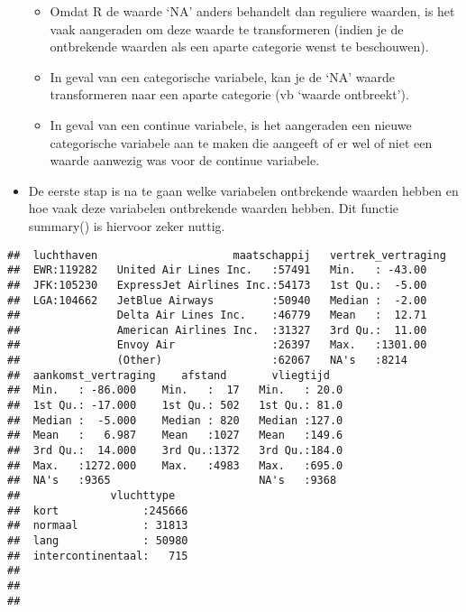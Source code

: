 \documentclass[]{memoir}
\providecommand{\tightlist}{%
  \setlength{\itemsep}{0pt}\setlength{\parskip}{0pt}}
\begin{document}
\begin{itemize}
  \begin{itemize}
  \tightlist
  \item
    Omdat R de waarde `NA' anders behandelt dan reguliere waarden, is het vaak aangeraden om deze waarde te transformeren (indien je de ontbrekende waarden als een aparte categorie wenst te beschouwen).
  \item
    In geval van een categorische variabele, kan je de `NA' waarde transformeren naar een aparte categorie (vb `waarde ontbreekt').
  \item
    In geval van een continue variabele, is het aangeraden een nieuwe categorische variabele aan te maken die aangeeft of er wel of niet een waarde aanwezig was voor de continue variabele.
  \end{itemize}
\item
  De eerste stap is na te gaan welke variabelen ontbrekende waarden hebben en hoe vaak deze variabelen ontbrekende waarden hebben. Dit functie summary() is hiervoor zeker nuttig.
\end{itemize}

\begin{verbatim}
##  luchthaven                     maatschappij   vertrek_vertraging
##  EWR:119282   United Air Lines Inc.   :57491   Min.   : -43.00   
##  JFK:105230   ExpressJet Airlines Inc.:54173   1st Qu.:  -5.00   
##  LGA:104662   JetBlue Airways         :50940   Median :  -2.00   
##               Delta Air Lines Inc.    :46779   Mean   :  12.71   
##               American Airlines Inc.  :31327   3rd Qu.:  11.00   
##               Envoy Air               :26397   Max.   :1301.00   
##               (Other)                 :62067   NA's   :8214      
##  aankomst_vertraging    afstand       vliegtijd    
##  Min.   : -86.000    Min.   :  17   Min.   : 20.0  
##  1st Qu.: -17.000    1st Qu.: 502   1st Qu.: 81.0  
##  Median :  -5.000    Median : 820   Median :127.0  
##  Mean   :   6.987    Mean   :1027   Mean   :149.6  
##  3rd Qu.:  14.000    3rd Qu.:1372   3rd Qu.:184.0  
##  Max.   :1272.000    Max.   :4983   Max.   :695.0  
##  NA's   :9365                       NA's   :9368   
##              vluchttype    
##  kort             :245666  
##  normaal          : 31813  
##  lang             : 50980  
##  intercontinentaal:   715  
##                            
##                            
## 
\end{verbatim}
\end{document}
